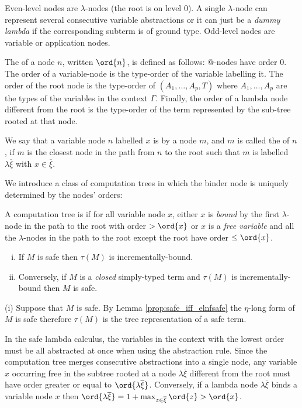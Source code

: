 Even-level nodes are $\lambda$-nodes (the root is on level 0). A
single $\lambda$-node can represent several consecutive variable
abstractions or it can just be a \emph{dummy lambda} if the
corresponding subterm is of ground type.  Odd-level nodes are
variable or application nodes.

The  of a node $n$, written $\ord{n}$, is defined as
follows: @-nodes have order $0$. The order of a variable-node is the
type-order of the variable labelling it. The order of the root node
is the type-order of $(A_1,\ldots,A_p, T)$ where $A_1,\ldots, A_p$
are the types of the variables in the context $\Gamma$. Finally, the
order of a lambda node different from the root is the type-order of
the term represented by the sub-tree rooted at that node.

We say that a variable node $n$ labelled $x$ is  by a
node $m$, and $m$ is called the  of $n$, if $m$ is
the closest node in the path from $n$ to the root such that $m$ is
labelled $\lambda \overline{\xi}$ with $x\in \overline{\xi}$.


We introduce a class of computation trees in which the binder node
is uniquely determined by the nodes' orders:
\begin{definition}\rm
  A computation tree is  if for all
  variable node $x$, either $x$ is \emph{bound} by the first
  $\lambda$-node in the path to the root with order $> \ord{x}$ or $x$
  is a \emph{free variable} and all the $\lambda$-nodes in the path to
  the root except the root have order $\leq \ord{x}$.
\end{definition}

\begin{proposition} \hfill
\label{prop:safe_imp_incrbound}
\begin{enumerate}[(i)]
\item If $M$ is safe then $\tau(M)$ is incrementally-bound.
\item Conversely, if $M$ is a \emph{closed} simply-typed term and $\tau(M)$
is incrementally-bound then $M$ is safe.
\end{enumerate}
\end{proposition}
\proof
  (i) Suppose that $M$ is safe. By Lemma
  \ref{prop:safe_iff_elnfsafe} the $\eta$-long form of $M$ is safe
  therefore $\tau(M)$ is the tree representation of a safe term.

In the safe lambda calculus, the variables in the context with the
lowest order must be all abstracted at once when using the
abstraction rule. Since the computation tree merges consecutive
abstractions into a single node, any variable $x$ occurring free in
the subtree rooted at a node $\lambda \overline{\xi}$ different from
the root must have order greater or equal to $\ord{\lambda
  \overline{\xi}}$. Conversely, if a lambda node $\lambda
\overline{\xi}$ binds a variable node $x$ then $\ord{\lambda
  \overline{\xi}} = 1+\max_{z\in\overline{\xi}} \ord{z} > \ord{x}$.

